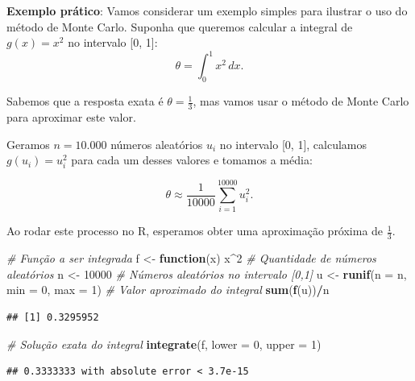 \documentclass[
]{book}
\newenvironment{Shaded}{\begin{snugshade}}{\end{snugshade}}
\newcommand{\AttributeTok}[1]{\textcolor[rgb]{0.13,0.29,0.53}{#1}}
\newcommand{\CommentTok}[1]{\textcolor[rgb]{0.56,0.35,0.01}{\textit{#1}}}
\newcommand{\ControlFlowTok}[1]{\textcolor[rgb]{0.13,0.29,0.53}{\textbf{#1}}}
\newcommand{\DecValTok}[1]{\textcolor[rgb]{0.00,0.00,0.81}{#1}}
\newcommand{\FunctionTok}[1]{\textcolor[rgb]{0.13,0.29,0.53}{\textbf{#1}}}
\newcommand{\NormalTok}[1]{#1}
\newcommand{\OtherTok}[1]{\textcolor[rgb]{0.56,0.35,0.01}{#1}}
\newcommand{\SpecialCharTok}[1]{\textcolor[rgb]{0.81,0.36,0.00}{\textbf{#1}}}
\begin{document}
\textbf{Exemplo prático}: Vamos considerar um exemplo simples para ilustrar o
uso do método de Monte Carlo. Suponha que queremos calcular a integral
de \(g(x) = x^2\) no intervalo {[}0, 1{]}: \[\theta = \int_{0}^{1} x^2\, dx.\]

Sabemos que a resposta exata é \(\theta = \frac{1}{3}\), mas vamos usar o
método de Monte Carlo para aproximar este valor.

Geramos \(n = 10.000\) números aleatórios \(u_i\) no intervalo {[}0, 1{]},
calculamos \(g(u_i) = u_i^2\) para cada um desses valores e tomamos a
média:

\[\theta \approx \frac{1}{10000} \sum_{i=1}^{10000} u_i^2.\]

Ao rodar este processo no R, esperamos obter uma aproximação próxima de
\(\frac{1}{3}\).

\begin{Shaded}
\begin{Highlighting}[]
\CommentTok{\# Função a ser integrada}
\NormalTok{f }\OtherTok{\textless{}{-}} \ControlFlowTok{function}\NormalTok{(x) x}\SpecialCharTok{\^{}}\DecValTok{2}
\CommentTok{\# Quantidade de números aleatórios}
\NormalTok{n }\OtherTok{\textless{}{-}} \DecValTok{10000}
\CommentTok{\# Números aleatórios no intervalo [0,1]}
\NormalTok{u }\OtherTok{\textless{}{-}} \FunctionTok{runif}\NormalTok{(}\AttributeTok{n =}\NormalTok{ n, }\AttributeTok{min =} \DecValTok{0}\NormalTok{, }\AttributeTok{max =} \DecValTok{1}\NormalTok{)}
\CommentTok{\# Valor aproximado do integral}
\FunctionTok{sum}\NormalTok{(}\FunctionTok{f}\NormalTok{(u))}\SpecialCharTok{/}\NormalTok{n}
\end{Highlighting}
\end{Shaded}

\begin{verbatim}
## [1] 0.3295952
\end{verbatim}

\begin{Shaded}
\begin{Highlighting}[]
\CommentTok{\# Solução exata do integral}
\FunctionTok{integrate}\NormalTok{(f, }\AttributeTok{lower =} \DecValTok{0}\NormalTok{, }\AttributeTok{upper =} \DecValTok{1}\NormalTok{)}
\end{Highlighting}
\end{Shaded}

\begin{verbatim}
## 0.3333333 with absolute error < 3.7e-15
\end{verbatim}
\end{document}
